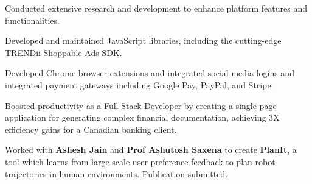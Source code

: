 \documentclass[letterpaper]{deedy-resume} %
\begin{document}
\begin{minipage}[t]{0.66\textwidth}
Conducted extensive research and development to enhance platform features and functionalities.

Developed and maintained JavaScript libraries, including the cutting-edge TRENDii Shoppable Ads SDK.

Developed Chrome browser extensions and integrated social media logins and integrated payment gateways including Google Pay, PayPal, and Stripe.

Boosted productivity as a Full Stack Developer by creating a single-page application for generating complex financial documentation, achieving 3X efficiency gains for a Canadian banking client.

\sectionspace %


Worked with \textbf{\href{http://www.cs.cornell.edu/~ashesh/}{Ashesh Jain}} and \textbf{\href{http://www.cs.cornell.edu/~asaxena/}{Prof Ashutosh Saxena}} to create \textbf{PlanIt}, a tool which learns from large scale user preference feedback to plan robot trajectories in human environments. Publication submitted.

\sectionspace %






\end{minipage} %








\end{document}
